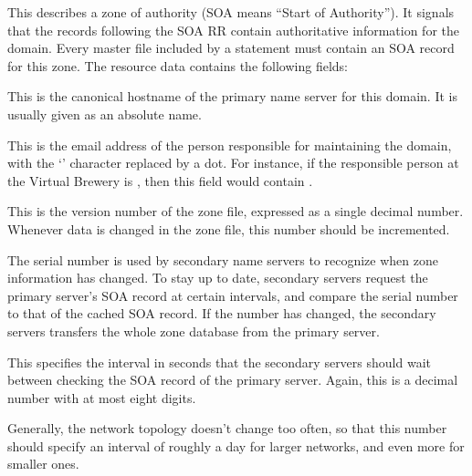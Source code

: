\documentclass[11pt,makeidx]{report}
\begin{document}
{\newpage
\clearpage
\samepage \begin{dispitems}%
\ditem[SOA]

This describes a zone of authority (SOA means ``Start of
Authority''). It signals that the records following the SOA
RR contain authoritative information for the domain. Every master file
included by a  statement must contain an SOA
record for this zone. The resource data contains the following fields:


\begin{dispitems}
        This is the canonical hostname of the primary name server
        for this domain. It is usually given as an absolute name.

        This is the email address of the person responsible for
        maintaining the domain, with the `' character
        replaced by a dot. For instance, if the responsible person at
        the Virtual Brewery is , then this field would
        contain .

        This is the version number of the zone file, expressed as a
        single decimal number. Whenever data is changed in the zone
        file, this number should be incremented.

        The serial number is used by secondary name servers to recognize
        when zone information has changed. To stay up to date, secondary
        servers request the primary server's SOA record at certain
        intervals, and compare the serial number to that of the cached
        SOA record.  If the number has changed, the secondary servers
        transfers the whole zone database from the primary server.

        This specifies the interval in seconds that the secondary
        servers should wait between checking the SOA record of the
        primary server. Again, this is a decimal number with at most
        eight digits.

        Generally, the network topology doesn't change too often, so
        that this number should specify an interval of roughly a day for
        larger networks, and even more for smaller ones.


\end{dispitems}
\end{dispitems}}
\end{document}
